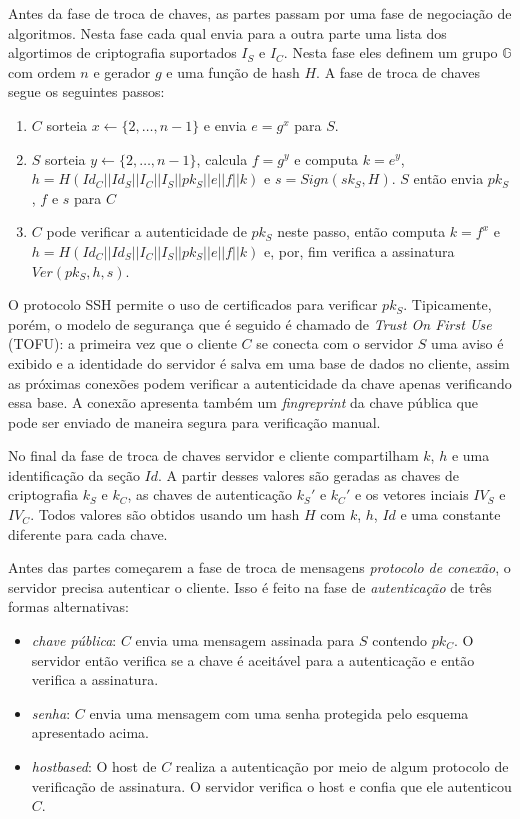 Antes da fase de troca de chaves, as partes passam por uma fase de negociação de algoritmos.
Nesta fase cada qual envia para a outra parte uma lista dos algortimos de criptografia suportados $I_S$ e $I_C$.
Nesta fase eles definem um grupo $\mathbb{G}$ com ordem $n$ e gerador $g$ e uma função de hash $H$.
A fase de troca de chaves segue os seguintes passos:
\begin{enumerate}
\item $C$ sorteia $x \leftarrow \{2, \dots, n-1\}$ e envia $e = g^x$ para $S$.
\item $S$ sorteia $y \leftarrow \{2, \dots, n-1\}$, calcula $f = g^y$ e computa $k = e^y$, $h = H(Id_C || Id_S || I_C || I_S || pk_S || e || f || k)$ e $s = Sign(sk_S, H)$.
$S$ então envia $pk_S$, $f$ e $s$ para $C$
\item $C$ pode verificar a autenticidade de $pk_S$ neste passo, então computa $k = f^x$ e $h = H(Id_C || Id_S || I_C || I_S || pk_S || e || f || k)$ e, por, fim verifica a assinatura $Ver(pk_S, h, s)$.
\end{enumerate}

O protocolo SSH permite o uso de certificados para verificar $pk_S$.
Tipicamente, porém, o modelo de segurança que é seguido é chamado de {\em Trust On First Use} (TOFU): a primeira vez que o cliente $C$ se conecta com o servidor $S$ uma aviso é exibido e a identidade do servidor é salva em uma base de dados no cliente, assim as próximas conexões podem verificar a autenticidade da chave apenas verificando essa base.
A conexão apresenta também um {\em fingreprint} da chave pública que pode ser enviado de maneira segura para verificação manual.

No final da fase de troca de chaves servidor e cliente compartilham $k$, $h$ e uma identificação da seção $Id$.
A partir desses valores são geradas as chaves de criptografia $k_S$ e $k_C$, as chaves de autenticação $k_S'$ e $k_C'$ e os vetores inciais $IV_S$ e $IV_C$.
Todos valores são obtidos usando um hash $H$ com $k$, $h$, $Id$ e uma constante diferente para cada chave.

Antes das partes começarem a fase de troca de mensagens {\em protocolo de conexão}, o servidor precisa autenticar o cliente.
Isso é feito na fase de {\em autenticação} de três formas alternativas:
\begin{itemize}
\item {\em chave pública}: $C$ envia uma mensagem assinada para $S$ contendo $pk_C$. 
O servidor então verifica se a chave é aceitável para a autenticação e então verifica a assinatura.
\item {\em senha}: $C$ envia uma mensagem com uma senha protegida pelo esquema apresentado acima.
\item {\em hostbased}: O host de $C$ realiza a autenticação por meio de algum protocolo de verificação de assinatura.
O servidor verifica o host e confia que ele autenticou $C$.
\end{itemize}

